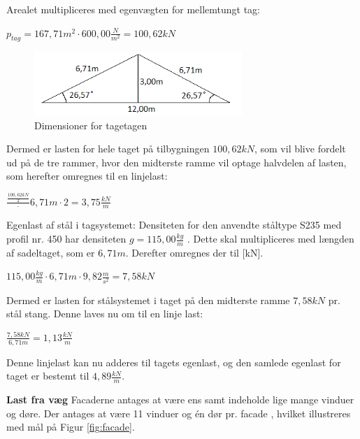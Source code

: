 Arealet multipliceres med egenvægten for mellemtungt tag:
\begin{center}
	$p_{tag} = 167,\!71 m^2\cdot 600,\!00 \frac{N}{m^2}=100,\!62 kN$
\end{center}

\begin{figure}[H]
	\centering
	\includegraphics[width=0.7\textwidth]{billeder/Tagmedvinkel.png}
	\caption{Dimensioner for tagetagen}
	\label{fig:tagetage}
\end{figure}

Dermed er lasten for hele taget på tilbygningen $100,\!62 kN$, som vil blive fordelt ud på de tre rammer, hvor den midterste ramme vil optage halvdelen af lasten, som herefter omregnes til en linjelast:
\begin{center}
	$\frac{\frac{100,\!62 kN}{2}}\cdot{6,\!71 m \cdot 2} = 3,\!75 \frac{kN}{m}$
\end{center}

Egenlast af stål i tagsystemet:
\newline
Densiteten for den anvendte ståltype S235 med profil nr. 450 har densiteten $g = 115,\!00\frac{kg}{m}$ \citep{stabi}. Dette skal multipliceres med længden af sadeltaget, som er $6,\!71 m$. Derefter omregnes der til [kN].
\begin{center}
	$115,\!00 \frac{kg}{m}\cdot 6,\!71m \cdot 9,\!82\frac{m}{s^2} = 7,\!58 kN$
\end{center}

Dermed er lasten for stålsystemet i taget på den midterste ramme $7,\!58 kN$ pr. stål stang. Denne laves nu om til en linje last: 
\begin{center}
	$\frac{7,\!58 kN}{6,\!71m}= 1,\!13 \frac{kN}{m}$
\end{center}

Denne linjelast kan nu adderes til tagets egenlast, og den samlede egenlast for taget er bestemt til $4, \!89 \frac{kN}{m}$. 

\textbf{Last fra væg}
\newline
Facaderne antages at være ens samt indeholde lige mange vinduer og døre. Der antages at være 11 vinduer og én dør pr. facade \citep{gammellokalplan}, hvilket illustreres med mål på Figur \ref{fig:facade}.

